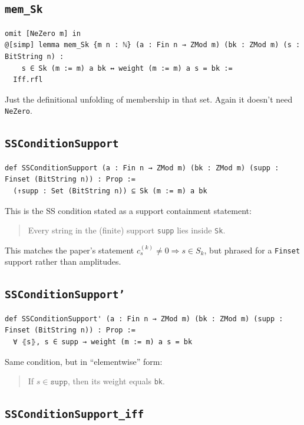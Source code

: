 \documentclass[11pt]{article}
\begin{document}
\subsection*{\texttt{mem\_Sk}}

\begin{lstlisting}
omit [NeZero m] in
@[simp] lemma mem_Sk {m n : ℕ} (a : Fin n → ZMod m) (bk : ZMod m) (s : BitString n) :
    s ∈ Sk (m := m) a bk ↔ weight (m := m) a s = bk :=
  Iff.rfl
\end{lstlisting}

Just the definitional unfolding of membership in that set. Again it doesn’t need \texttt{NeZero}.

\subsection*{\texttt{SSConditionSupport}}

\begin{lstlisting}
def SSConditionSupport (a : Fin n → ZMod m) (bk : ZMod m) (supp : Finset (BitString n)) : Prop :=
  (↑supp : Set (BitString n)) ⊆ Sk (m := m) a bk
\end{lstlisting}

This is the SS condition stated as a support containment statement:

\begin{quote}
Every string in the (finite) support \texttt{supp} lies inside \texttt{Sk}.
\end{quote}

This matches the paper’s statement $c^{(k)}_s\neq 0 \Rightarrow s\in S_k$,
but phrased for a \texttt{Finset} support rather than amplitudes.

\subsection*{\texttt{SSConditionSupport'}}

\begin{lstlisting}
def SSConditionSupport' (a : Fin n → ZMod m) (bk : ZMod m) (supp : Finset (BitString n)) : Prop :=
  ∀ ⦃s⦄, s ∈ supp → weight (m := m) a s = bk
\end{lstlisting}

Same condition, but in “elementwise” form:

\begin{quote}
If $s\in\texttt{supp}$, then its weight equals \texttt{bk}.
\end{quote}

\subsection*{\texttt{SSConditionSupport\_iff}}
\end{document}
